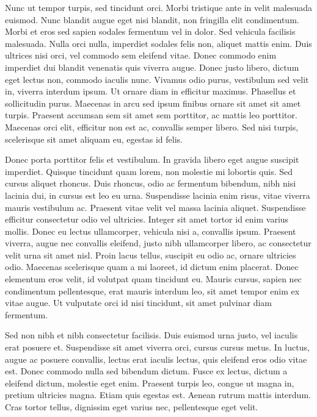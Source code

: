 \documentclass[12pt]{article}
\begin{document}
Nunc ut tempor turpis, sed tincidunt orci. Morbi tristique ante in velit malesuada euismod. Nunc blandit augue eget nisi blandit, non fringilla elit condimentum. Morbi et eros sed sapien sodales fermentum vel in dolor. Sed vehicula facilisis malesuada. Nulla orci nulla, imperdiet sodales felis non, aliquet mattis enim. Duis ultrices nisi orci, vel commodo sem eleifend vitae. Donec commodo enim imperdiet dui blandit venenatis quis viverra augue. Donec justo libero, dictum eget lectus non, commodo iaculis nunc. Vivamus odio purus, vestibulum sed velit in, viverra interdum ipsum. Ut ornare diam in efficitur maximus. Phasellus et sollicitudin purus. Maecenas in arcu sed ipsum finibus ornare sit amet sit amet turpis. Praesent accumsan sem sit amet sem porttitor, ac mattis leo porttitor. Maecenas orci elit, efficitur non est ac, convallis semper libero. Sed nisi turpis, scelerisque sit amet aliquam eu, egestas id felis.

Donec porta porttitor felis et vestibulum. In gravida libero eget augue suscipit imperdiet. Quisque tincidunt quam lorem, non molestie mi lobortis quis. Sed cursus aliquet rhoncus. Duis rhoncus, odio ac fermentum bibendum, nibh nisi lacinia dui, in cursus est leo eu urna. Suspendisse lacinia enim risus, vitae viverra mauris vestibulum ac. Praesent vitae velit vel massa lacinia aliquet. Suspendisse efficitur consectetur odio vel ultricies. Integer sit amet tortor id enim varius mollis. Donec eu lectus ullamcorper, vehicula nisi a, convallis ipsum. Praesent viverra, augue nec convallis eleifend, justo nibh ullamcorper libero, ac consectetur velit urna sit amet nisl. Proin lacus tellus, suscipit eu odio ac, ornare ultricies odio. Maecenas scelerisque quam a mi laoreet, id dictum enim placerat. Donec elementum eros velit, id volutpat quam tincidunt eu. Mauris cursus, sapien nec condimentum pellentesque, erat mauris interdum leo, sit amet tempor enim ex vitae augue. Ut vulputate orci id nisi tincidunt, sit amet pulvinar diam fermentum.

Sed non nibh et nibh consectetur facilisis. Duis euismod urna justo, vel iaculis erat posuere et. Suspendisse sit amet viverra orci, cursus cursus metus. In luctus, augue ac posuere convallis, lectus erat iaculis lectus, quis eleifend eros odio vitae est. Donec commodo nulla sed bibendum dictum. Fusce ex lectus, dictum a eleifend dictum, molestie eget enim. Praesent turpis leo, congue ut magna in, pretium ultricies magna. Etiam quis egestas est. Aenean rutrum mattis interdum. Cras tortor tellus, dignissim eget varius nec, pellentesque eget velit.
\end{document}
